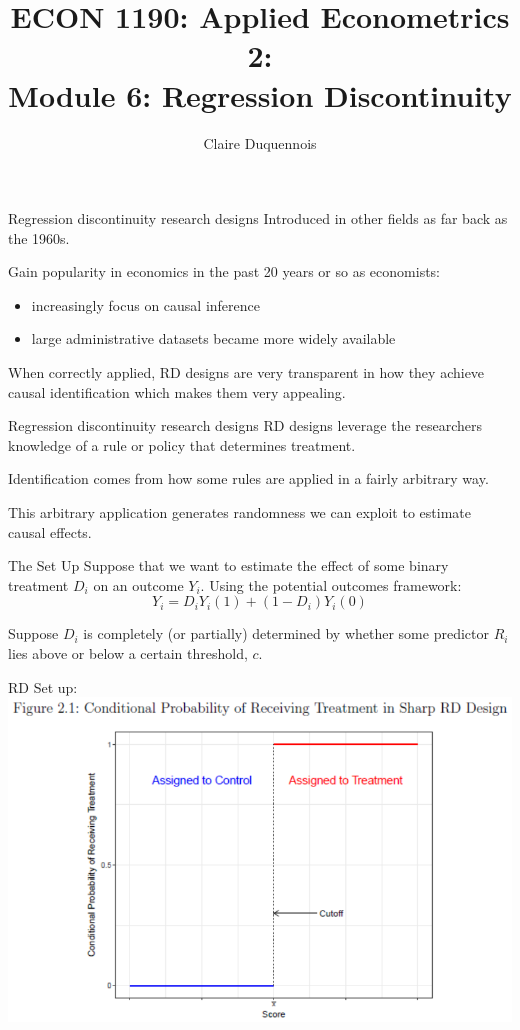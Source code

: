 \documentclass[
  ignorenonframetext,
]{beamer}
\title{ECON 1190: Applied Econometrics 2:\\
Module 6: Regression Discontinuity}
\author{Claire Duquennois}
\date{}
\begin{document}
\frame{\titlepage}

\begin{frame}{Regression discontinuity research designs}
\protect\hypertarget{regression-discontinuity-research-designs}{}
Introduced in other fields as far back as the 1960s.

Gain popularity in economics in the past 20 years or so as economists:

\begin{itemize}
\item
  increasingly focus on causal inference
\item
  large administrative datasets became more widely available
\end{itemize}

When correctly applied, RD designs are very transparent in how they
achieve causal identification which makes them very appealing.
\end{frame}

\begin{frame}{Regression discontinuity research designs}
\protect\hypertarget{regression-discontinuity-research-designs-1}{}
RD designs leverage the researchers knowledge of a rule or policy that
determines treatment.

Identification comes from how some rules are applied in a fairly
arbitrary way.

This arbitrary application generates randomness we can exploit to
estimate causal effects.
\end{frame}

\begin{frame}{The Set Up}
\protect\hypertarget{the-set-up}{}
Suppose that we want to estimate the effect of some binary treatment
\(D_i\) on an outcome \(Y_i\). Using the potential outcomes framework:
\[
Y_i=D_iY_i(1)+(1-D_i)Y_i(0)
\]

Suppose \(D_i\) is completely (or partially) determined by whether some
predictor \(R_i\) lies above or below a certain threshold, \(c\).
\end{frame}

\begin{frame}{RD Set up:}
\protect\hypertarget{rd-set-up}{}
\includegraphics{"images/sharpRD.png"}
\end{frame}
\end{document}
